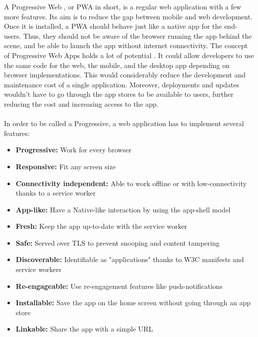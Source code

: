 \documentclass{kththesis}
\begin{document}
A Progressive Web , or PWA in short, is a regular web application with a few more features. Its aim is to reduce the gap between mobile and web development. Once it is installed, a PWA should behave just like a native app for the end-users. Thus, they should not be aware of the browser running the app behind the scene, and be able to launch the app without internet connectivity. \newline
The concept of Progressive Web Apps holds a lot of potential \cite{PWApossibleUnifer}. It could allow developers to use the same code for the web, the mobile, and the desktop app depending on browser implementations. This would considerably reduce the development and maintenance cost of a single application. Moreover, deployments and updates wouldn't have to go through the app stores to be available to users, further reducing the cost and increasing access to the app.
\paragraph{}
In order to be called a Progressive, a web application has to implement several features\cite{PWA_def}:

\begin{itemize}
    \item \textbf{Progressive:} Work for every browser
    \item \textbf{Responsive:} Fit any screen size
    \item \textbf{Connectivity independent:} Able to work offline or with low-connectivity thanks to a service worker
    \item \textbf{App-like:} Have a Native-like interaction by using the app-shell model
    \item \textbf{Fresh:} Keep the app up-to-date with the service worker
    \item \textbf{Safe:} Served over TLS to prevent snooping and content tampering
    \item \textbf{Discoverable:} Identifiable as "applications" thanks to W3C manifests and service workers
    \item \textbf{Re-engageable:} Use re-engagement features like push-notifications
    \item \textbf{Installable:} Save the app on the home screen without going through an app store
    \item \textbf{Linkable:} Share the app with a simple URL
\end{itemize}
\end{document}
